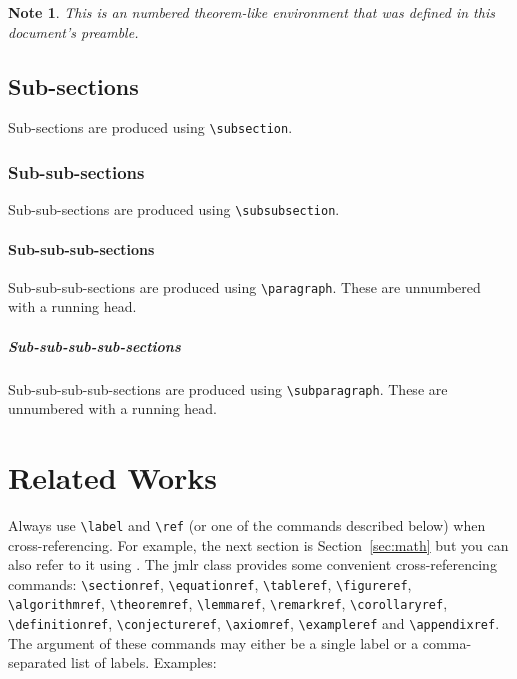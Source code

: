 \documentclass[pmlr,twocolumn,10pt]{jmlr} %
\newtheorem*{note}{Note}
\begin{document}
\begin{note}
This is an numbered theorem-like environment that was defined in
this document's preamble.
\end{note}

\subsection{Sub-sections}

Sub-sections are produced using \verb|\subsection|.

\subsubsection{Sub-sub-sections}

Sub-sub-sections are produced using \verb|\subsubsection|.

\paragraph{Sub-sub-sub-sections}

Sub-sub-sub-sections are produced using \verb|\paragraph|.
These are unnumbered with a running head.

\subparagraph{Sub-sub-sub-sub-sections}

Sub-sub-sub-sub-sections are produced using \verb|\subparagraph|.
These are unnumbered with a running head.

\section{Related Works}

Always use \verb|\label| and \verb|\ref| (or one of the commands
described below) when cross-referencing.  For example, the next
section is Section~\ref{sec:math} but you can also refer to it using
. The \textsf{jmlr} class
provides some convenient cross-referencing commands:
\verb|\sectionref|, \verb|\equationref|, \verb|\tableref|,
\verb|\figureref|, \verb|\algorithmref|, \verb|\theoremref|,
\verb|\lemmaref|, \verb|\remarkref|, \verb|\corollaryref|,
\verb|\definitionref|, \verb|\conjectureref|, \verb|\axiomref|,
\verb|\exampleref| and \verb|\appendixref|. The argument of these
commands may either be a single label or a comma-separated list
of labels. Examples:
\end{document}
